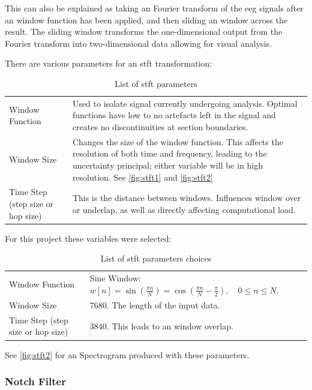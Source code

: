 \documentclass[12pt]{article}
\begin{document}
This can also be explained as taking an Fourier transform of the \acrshort{eeg} signals after an window function has been applied, and then sliding an window across the result. The sliding window transforms the one-dimensional output from the Fourier transform into two-dimensional data allowing for visual analysis. 


There are various parameters for an \acrshort{stft} transformation: 
\begin{table}[H]
\centering
\begin{tabular}{p{}p{}}
Window Function & Used to isolate signal currently undergoing analysis. Optimal functions have low to no artefacts left in the signal and creates no discontinuities at section boundaries.\\
Window Size & Changes the size of the window function. This affects the resolution of both time and frequency, leading to the uncertainty principal; either variable will be in high resolution. See \ref{fig:stft1} and \ref{fig:stft2} \\
Time Step (step size or hop size) & This is the distance between windows. Influences window over or underlap, as well as directly affecting computational load. \\                            
\end{tabular}
\caption{List of \acrfull{stft} parameters}
\label{tab:stft_params}
\end{table}

For this project these variables were selected:

\begin{table}[H]
\centering
\begin{tabular}{p{}p{}}
Window Function & Sine Window: $ w[n] = \sin\left(\frac{\pi n}{N}\right) = \cos\left(\frac{\pi n}{N} - \frac{\pi}{2}\right),\quad 0\le n \le N.$ \\
Window Size & 7680. The length of the input data. \\
Time Step (step size or hop size) & 3840. This leads to an window overlap. \\                            
\end{tabular}
\caption{List of \acrfull{stft} parameters choices}
\label{tab:stft_choices}
\end{table}

See \ref{fig:stft2} for an Spectrogram produced with these parameters. 

\subsubsection{Notch Filter}
\end{document}
